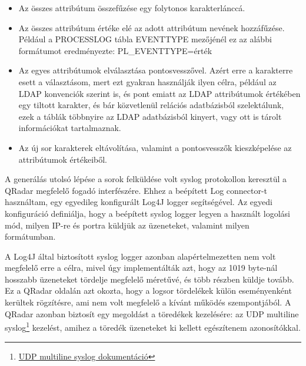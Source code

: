 \begin{itemize}
	\item Az összes attribútum összefűzése egy folytonos karakterlánccá.
	
	\item Az összes attribútum értéke elé az adott attribútum nevének hozzáfűzése. Például a PROCESSLOG tábla EVENTTYPE mezőjénél ez az alábbi formátumot eredményezte: PL\_EVENTTYPE={érték}
	
	\item Az egyes attribútumok elválasztása pontosvesszővel. Azért erre a karakterre esett a választásom, mert ezt gyakran használják ilyen célra, például az LDAP konvenciók szerint is, és pont emiatt az LDAP attribútumok értékében egy tiltott karakter, és bár közvetlenül relációs adatbázisból szelektálunk, ezek a táblák többnyire az LDAP adatbázisból kinyert, vagy ott is tárolt információkat tartalmaznak.
	
	\item Az új sor karakterek eltávolítása, valamint a pontosvesszők \todo kieszképelése az attribútumok értékeiből.
\end{itemize} 




A generálás utolsó lépése a sorok felküldése volt syslog protokollon keresztül a QRadar megfelelő fogadó interfészére. Ehhez a beépített Log connector-t használtam, egy egyedileg konfigurált Log4J logger segítségével. Az egyedi konfiguráció definiálja, hogy a beépített syslog logger legyen a használt logolási mód, milyen IP-re és portra küldjük az üzeneteket, valamint milyen formátumban.

A Log4J által biztosított syslog logger azonban alapértelmezetten nem volt megfelelő erre a célra, mivel úgy implementálták azt, hogy az 1019 byte-nál hosszabb üzeneteket tördelje megfelelő méretűvé, és több részben küldje tovább. Ez a QRadar oldalán azt okozta, hogy a logsor tördelékek külön eseményenként kerültek rögzítésre, ami nem volt megfelelő a kívánt működés szempontjából. A QRadar azonban biztosít egy megoldást a töredékek kezelésére: az UDP multiline syslog\footnote{ \href{https://www.ibm.com/support/knowledgecenter/SS42VS_7.2.2/com.ibm.qradar.doc_7.2.2/t_logsource_UDPmultiprotocol.html}{UDP multiline syslog dokumentáció}} kezelést, amihez a töredék üzeneteket ki kellett egészítenem azonosítókkal.

